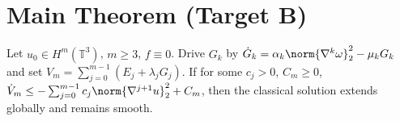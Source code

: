 \section{Main Theorem (Target B)}\label{sec:main_theorem}
Let $u_0\in H^m(\mathbb{T}^3)$, $m\ge 3$, $f\equiv0$.
Drive $G_k$ by $\dot G_k=\alpha_k\norm{\nabla^k\omega}_2^2-\mu_k G_k$ and set $V_m=\sum_{j=0}^{m-1}(E_j+\lambda_j G_j)$.
If for some $c_j>0$, $C_m\ge0$,
$\dot V_m \le -\sum_{j=0}^{m-1} c_j \norm{\nabla^{j+1}u}_2^2 + C_m$,
then the classical solution extends globally and remains smooth.

